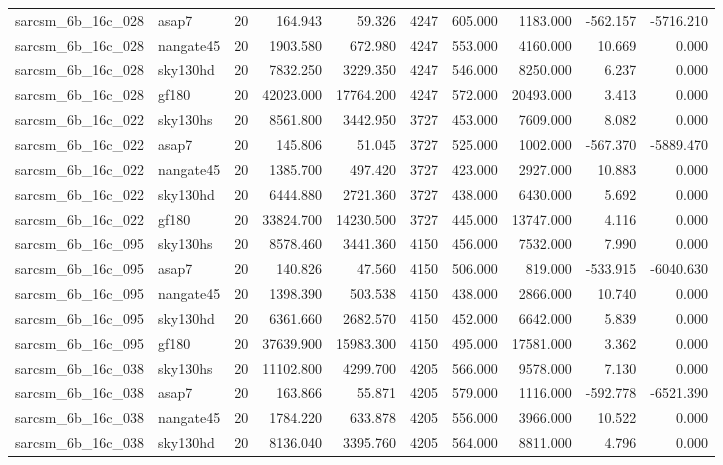 \begin{longtable}{llrrrrrrrr}
sarcsm\_6b\_16c\_028 & asap7 & 20 & 164.943 & 59.326 & 4247 & 605.000 & 1183.000 & -562.157 & -5716.210 \\
sarcsm\_6b\_16c\_028 & nangate45 & 20 & 1903.580 & 672.980 & 4247 & 553.000 & 4160.000 & 10.669 & 0.000 \\
sarcsm\_6b\_16c\_028 & sky130hd & 20 & 7832.250 & 3229.350 & 4247 & 546.000 & 8250.000 & 6.237 & 0.000 \\
sarcsm\_6b\_16c\_028 & gf180 & 20 & 42023.000 & 17764.200 & 4247 & 572.000 & 20493.000 & 3.413 & 0.000 \\
sarcsm\_6b\_16c\_022 & sky130hs & 20 & 8561.800 & 3442.950 & 3727 & 453.000 & 7609.000 & 8.082 & 0.000 \\
sarcsm\_6b\_16c\_022 & asap7 & 20 & 145.806 & 51.045 & 3727 & 525.000 & 1002.000 & -567.370 & -5889.470 \\
sarcsm\_6b\_16c\_022 & nangate45 & 20 & 1385.700 & 497.420 & 3727 & 423.000 & 2927.000 & 10.883 & 0.000 \\
sarcsm\_6b\_16c\_022 & sky130hd & 20 & 6444.880 & 2721.360 & 3727 & 438.000 & 6430.000 & 5.692 & 0.000 \\
sarcsm\_6b\_16c\_022 & gf180 & 20 & 33824.700 & 14230.500 & 3727 & 445.000 & 13747.000 & 4.116 & 0.000 \\
sarcsm\_6b\_16c\_095 & sky130hs & 20 & 8578.460 & 3441.360 & 4150 & 456.000 & 7532.000 & 7.990 & 0.000 \\
sarcsm\_6b\_16c\_095 & asap7 & 20 & 140.826 & 47.560 & 4150 & 506.000 & 819.000 & -533.915 & -6040.630 \\
sarcsm\_6b\_16c\_095 & nangate45 & 20 & 1398.390 & 503.538 & 4150 & 438.000 & 2866.000 & 10.740 & 0.000 \\
sarcsm\_6b\_16c\_095 & sky130hd & 20 & 6361.660 & 2682.570 & 4150 & 452.000 & 6642.000 & 5.839 & 0.000 \\
sarcsm\_6b\_16c\_095 & gf180 & 20 & 37639.900 & 15983.300 & 4150 & 495.000 & 17581.000 & 3.362 & 0.000 \\
sarcsm\_6b\_16c\_038 & sky130hs & 20 & 11102.800 & 4299.700 & 4205 & 566.000 & 9578.000 & 7.130 & 0.000 \\
sarcsm\_6b\_16c\_038 & asap7 & 20 & 163.866 & 55.871 & 4205 & 579.000 & 1116.000 & -592.778 & -6521.390 \\
sarcsm\_6b\_16c\_038 & nangate45 & 20 & 1784.220 & 633.878 & 4205 & 556.000 & 3966.000 & 10.522 & 0.000 \\
sarcsm\_6b\_16c\_038 & sky130hd & 20 & 8136.040 & 3395.760 & 4205 & 564.000 & 8811.000 & 4.796 & 0.000 \\

\end{longtable}
